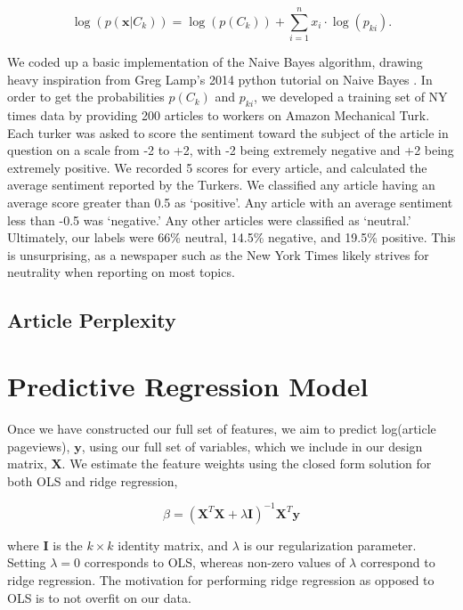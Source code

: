 \documentclass[fleqn,12pt]{SelfArx} %
\begin{document}
\begin{equation}
\log(p(\mathbf{x}|C_k)) = \log ( p(C_k)) + \sum_{i=1}^n x_i \cdot \log(p_{ki}).
\end{equation}

We coded up a basic implementation of the Naive Bayes algorithm, drawing heavy inspiration from Greg Lamp's 2014 python tutorial on Naive Bayes \cite{NaiveBayes}. In order to get the probabilities $p(C_k)$ and $p_{ki}$, we developed a training set of NY times data by providing 200 articles to workers on Amazon Mechanical Turk. Each turker was asked to score the sentiment toward the subject of the article in question on a scale from -2 to +2, with -2 being extremely negative and +2 being extremely positive. We recorded 5 scores for every article, and calculated the average sentiment reported by the Turkers. We classified any article having an average score greater than 0.5 as `positive'. Any article with an average sentiment less than -0.5 was `negative.' Any other articles were classified as `neutral.' Ultimately, our labels were 66\% neutral, 14.5\% negative, and 19.5\% positive. This is unsurprising, as a newspaper such as the New York Times likely strives for neutrality when reporting on most topics.

\subsection{Article Perplexity}

\section{Predictive Regression Model}

Once we have constructed our full set of features, we aim to predict log(article pageviews), $\mathbf{y}$, using our full set of variables, which we include in our design matrix, $\mathbf{X}$. We estimate the feature weights using the closed form solution for both OLS and ridge regression,

\begin{center}
\begin{equation}
\beta = (\mathbf{X}^T\mathbf{X} + \lambda \mathbf{I})^{-1}\mathbf{X}^T\mathbf{y}
\end{equation}
\end{center}

\noindent where $\mathbf{I}$ is the $k \times k$ identity matrix, and $\lambda$ is our regularization parameter. Setting $\lambda = 0$ corresponds to OLS, whereas non-zero values of $\lambda$ correspond to ridge regression. The motivation for performing ridge regression as opposed to OLS is to not overfit on our data. 
\end{document}
